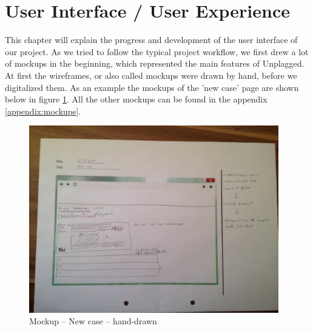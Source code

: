 \section{User Interface / User Experience}

This chapter will explain the progress and development of the user interface of our project. As we tried to follow the 
typical project workflow, we first drew a lot of mockups in the beginning, which represented the main features of 
Unplagged. At first the wireframes, or also called mockups were drawn by hand, before we digitalized them. As an example 
the mockups of the 'new case' page are shown below in figure \ref{fig:mNewCaseMockup}. All the other mockups can be found 
in the appendix \ref{appendix:mockups}.

\begin{figure}[htbp]
  \centering
    \includegraphics[width=0.97\textwidth]{mockups/m_new_case.jpg}
  \caption{Mockup -- New case -- hand-drawn}
  \label{fig:mNewCaseMockup}
\end{figure}

